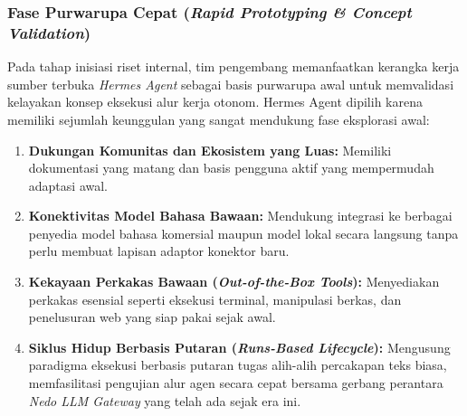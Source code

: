 \subsubsection{Fase Purwarupa Cepat (\textit{Rapid Prototyping \& Concept Validation})}
Pada tahap inisiasi riset internal, tim pengembang memanfaatkan kerangka kerja sumber terbuka \textit{Hermes Agent} sebagai basis purwarupa awal untuk memvalidasi kelayakan konsep eksekusi alur kerja otonom. Hermes Agent dipilih karena memiliki sejumlah keunggulan yang sangat mendukung fase eksplorasi awal:
\begin{enumerate}[label=\alph*.]
  \item \textbf{Dukungan Komunitas dan Ekosistem yang Luas:} Memiliki dokumentasi yang matang dan basis pengguna aktif yang mempermudah adaptasi awal.
  \item \textbf{Konektivitas Model Bahasa Bawaan:} Mendukung integrasi ke berbagai penyedia model bahasa komersial maupun model lokal secara langsung tanpa perlu membuat lapisan adaptor konektor baru.
  \item \textbf{Kekayaan Perkakas Bawaan (\textit{Out-of-the-Box Tools}):} Menyediakan perkakas esensial seperti eksekusi terminal, manipulasi berkas, dan penelusuran web yang siap pakai sejak awal.
  \item \textbf{Siklus Hidup Berbasis Putaran (\textit{Runs-Based Lifecycle}):} Mengusung paradigma eksekusi berbasis putaran tugas alih-alih percakapan teks biasa, memfasilitasi pengujian alur agen secara cepat bersama gerbang perantara \textit{Nedo LLM Gateway} yang telah ada sejak era ini.
\end{enumerate}

